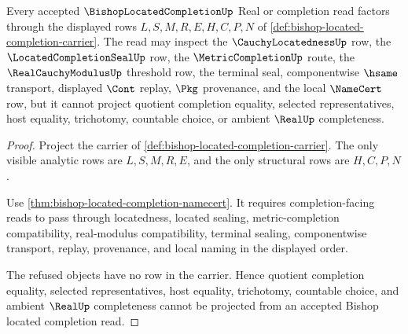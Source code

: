 \begin{theorem}
\label{thm:bishop-located-completion-nonescape}
Every accepted $\BishopLocatedCompletionUp$ Real or completion read factors through the displayed rows $L,S,M,R,E,H,C,P,N$ of \autoref{def:bishop-located-completion-carrier}. The read may inspect the $\CauchyLocatednessUp$ row, the $\LocatedCompletionSealUp$ row, the $\MetricCompletionUp$ route, the $\RealCauchyModulusUp$ threshold row, the terminal seal, componentwise $\hsame$ transport, displayed $\Cont$ replay, $\Pkg$ provenance, and the local $\NameCert$ row, but it cannot project quotient completion equality, selected representatives, host equality, trichotomy, countable choice, or ambient $\RealUp$ completeness.
\end{theorem}
\begin{proof}
Project the carrier of \autoref{def:bishop-located-completion-carrier}. The only visible analytic rows are $L,S,M,R,E$, and the only structural rows are $H,C,P,N$.

Use \autoref{thm:bishop-located-completion-namecert}. It requires completion-facing reads to pass through locatedness, located sealing, metric-completion compatibility, real-modulus compatibility, terminal sealing, componentwise transport, replay, provenance, and local naming in the displayed order.

The refused objects have no row in the carrier. Hence quotient completion equality, selected representatives, host equality, trichotomy, countable choice, and ambient $\RealUp$ completeness cannot be projected from an accepted Bishop located completion read.
\end{proof}




